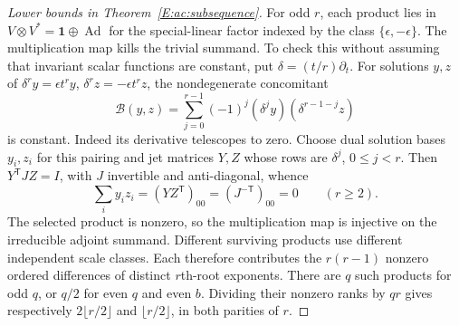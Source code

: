 \documentclass[11pt,a4paper]{article}
\theoremstyle{definition}
\theoremstyle{remark}
\numberwithin{equation}{section}
\begin{document}
\begin{proof}[Lower bounds in Theorem~\ref{E:ac:subsequence}]
For odd $r$, each product lies in
$V\otimes V^*=\mathbf1\oplus\operatorname{Ad}$ for the special-linear
factor indexed by the class $\{\epsilon,-\epsilon\}$.
The multiplication map kills the trivial summand. To check this
without assuming that invariant scalar functions are constant, put
$\delta=(t/r)\partial_t$. For solutions $y,z$ of
$\delta^r y=\epsilon t^r y$, $\delta^r z=-\epsilon t^r z$, the
nondegenerate concomitant
\[
 \mathcal B(y,z)=\sum_{j=0}^{r-1}(-1)^j
                  (\delta^j y)(\delta^{r-1-j}z)
\]
is constant. Indeed its derivative telescopes to zero.
Choose dual solution bases $y_i,z_i$ for this pairing and jet matrices
$Y,Z$ whose rows are $\delta^j$, $0\le j<r$. Then
$Y^{\mathsf T}JZ=I$, with $J$ invertible and anti-diagonal, whence
\[
 \sum_i y_i z_i=(YZ^{\mathsf T})_{00}=(J^{-\mathsf T})_{00}=0
 \qquad(r\ge2).
\]
The selected product is nonzero, so the multiplication map is
injective on the irreducible adjoint summand. Different surviving
products use different independent scale classes. Each therefore
contributes the $r(r-1)$ nonzero ordered differences of distinct
$r$th-root exponents. There are $q$ such products for odd $q$, or
$q/2$ for even $q$ and even $b$. Dividing their nonzero ranks by $qr$
gives respectively $2\lfloor r/2\rfloor$ and
$\lfloor r/2\rfloor$, in both parities of $r$.
\end{proof}
\end{document}
